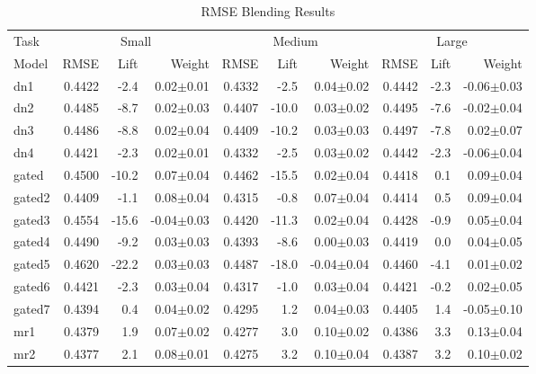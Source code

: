 \documentclass{article}
\begin{document}
\begin{table}[b]
\caption{RMSE Blending Results}
\label{table:rmse-results}
\vskip 0.15in
\begin{center}
\begin{small}
\begin{sc}
\begin{tabular}{l|rr r|rr r|rr r}
\hline
\abovespace\belowspace
Task & \multicolumn{3}{|c}{Small} & \multicolumn{3}{|c}{Medium} & \multicolumn{3}{|c}{Large} \\
Model
& RMSE & Lift & Weight 
& RMSE & Lift & Weight 
& RMSE & Lift & Weight \\
\hline
\abovespace
dn1        & 0.4422 &  -2.4 &  0.02$\pm$0.01& 0.4332 &  -2.5 &  0.04$\pm$0.02& 0.4442 &  -2.3 & -0.06$\pm$0.03 \\ 
dn2        & 0.4485 &  -8.7 &  0.02$\pm$0.03& 0.4407 & -10.0 &  0.03$\pm$0.02& 0.4495 &  -7.6 & -0.02$\pm$0.04 \\ 
dn3        & 0.4486 &  -8.8 &  0.02$\pm$0.04& 0.4409 & -10.2 &  0.03$\pm$0.03& 0.4497 &  -7.8 &  0.02$\pm$0.07 \\ 
dn4        & 0.4421 &  -2.3 &  0.02$\pm$0.01& 0.4332 &  -2.5 &  0.03$\pm$0.02& 0.4442 &  -2.3 & -0.06$\pm$0.04 \\ 
\abovespace
gated      & 0.4500 & -10.2 &  0.07$\pm$0.04& 0.4462 & -15.5 &  0.02$\pm$0.04& 0.4418 &   0.1 &  0.09$\pm$0.04 \\ 
gated2     & 0.4409 &  -1.1 &  0.08$\pm$0.04& 0.4315 &  -0.8 &  0.07$\pm$0.04& 0.4414 &   0.5 &  0.09$\pm$0.04 \\ 
gated3     & 0.4554 & -15.6 & -0.04$\pm$0.03& 0.4420 & -11.3 &  0.02$\pm$0.04& 0.4428 &  -0.9 &  0.05$\pm$0.04 \\ 
gated4     & 0.4490 &  -9.2 &  0.03$\pm$0.03& 0.4393 &  -8.6 &  0.00$\pm$0.03& 0.4419 &   0.0 &  0.04$\pm$0.05 \\ 
gated5     & 0.4620 & -22.2 &  0.03$\pm$0.03& 0.4487 & -18.0 & -0.04$\pm$0.04& 0.4460 &  -4.1 &  0.01$\pm$0.02 \\ 
gated6     & 0.4421 &  -2.3 &  0.03$\pm$0.04& 0.4317 &  -1.0 &  0.03$\pm$0.04& 0.4421 &  -0.2 &  0.02$\pm$0.05 \\ 
gated7     & 0.4394 &   0.4 &  0.04$\pm$0.02& 0.4295 &   1.2 &  0.04$\pm$0.03& 0.4405 &   1.4 & -0.05$\pm$0.10 \\ 
\abovespace
mr1        & 0.4379 &   1.9 &  0.07$\pm$0.02& 0.4277 &   3.0 &  0.10$\pm$0.02& 0.4386 &   3.3 &  0.13$\pm$0.04 \\ 
mr2        & 0.4377 &   2.1 &  0.08$\pm$0.01& 0.4275 &   3.2 &  0.10$\pm$0.04& 0.4387 &   3.2 &  0.10$\pm$0.02 \\ 

\end{tabular}
\end{sc}
\end{small}
\end{center}
\end{table}
\end{document}
